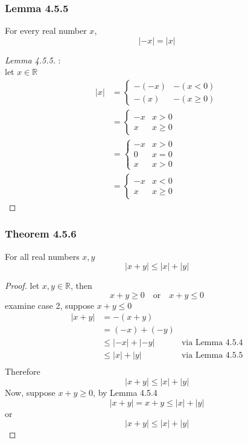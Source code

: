 \documentclass[12pt]{book}
\newcommand{\R}{\mathbb{R}}
\newcommand{\abso}[1]{\left|#1 \right|}
\begin{document}
\subsubsection{Lemma 4.5.5}
For every real number $x$,
\[
 \abso{-x} = \abso{x}
\]
\begin{proof}[Lemma 4.5.5]:\\
let $x \in \R$\\
\begin{align*}
\abso{x} &= 
\begin{cases}
    -(-x)  & -(x<0)\\
     -(x)  & -(x\geq 0)
\end{cases}\\
&=
\begin{cases}
    -x   & x>0   \\
     x   & x\geq 0
\end{cases}\\
&=
\begin{cases}
    -x   & x>0   \\
     0   & x = 0 \\
     x   & x> 0
\end{cases}\\
&= 
\begin{cases}
    -x  & x<0\\
     x  & x\geq 0
\end{cases}
\end{align*}

    
\end{proof}

\newpage

\subsubsection{Theorem 4.5.6}
For all real numbers $x,y$
\[
\abso{x+y} \leq \abso{x} + \abso{y}
\]
\begin{proof}
    let $x,y \in \R$, then
    \[
    x+y \geq 0 \quad \text{or} \quad x+y \leq 0
    \]
    examine case 2, suppose $x+y \leq 0$
    \begin{align*}
    \abso{x+y} &= -(x+y) \\
    &= (-x)+(-y)\\
    &\leq \abso{-x} + \abso{-y} & \text{via Lemma 4.5.4}\\
    &\leq \abso{x} + \abso{y} & \text{via Lemma 4.5.5}\\
    \end{align*}
    Therefore 
    \[
    \abso{x+y} \leq \abso{x} + \abso{y}
    \]
    Now, suppose $x+y \geq 0$, by Lemma 4.5.4
    \[
    \abso{x+y} = x+y \leq \abso{x} + \abso{y}
    \]
    or
    \[
    \abso{x+y} \leq \abso{x} + \abso{y}
    \]
    
\end{proof}
\end{document}
